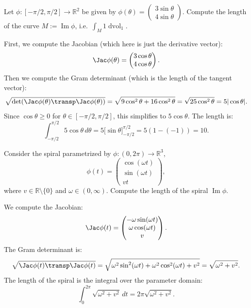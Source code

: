 \begin{example}
\label{ex:line_integral}
Let $\phi : [-\pi/2, \pi/2] \to \mathbb{R}^2$ be given by $\phi(\theta) = \begin{pmatrix} 3\sin\theta \\ 4\sin\theta \end{pmatrix}$.
Compute the length of the curve $M := \operatorname{Im}\phi$, i.e.\ $\int_M 1 \mathop{d\text{vol}}_1$.

First, we compute the Jacobian (which here is just the derivative vector):
\[\Jac\phi(\theta) = \begin{pmatrix} 3\cos\theta \\ 4\cos\theta \end{pmatrix}.\]
Then we compute the Gram determinant (which is the length of the tangent vector):
\[\sqrt{\det(\Jac\phi(\theta)\transp \Jac\phi(\theta))} = \sqrt{9\cos^2\theta + 16\cos^2\theta} = \sqrt{25\cos^2\theta} = 5|\cos\theta|.\]
Since $\cos\theta \geq 0$ for $\theta \in [-\pi/2, \pi/2]$, this simplifies to $5\cos\theta$.
The length is:
\[\int_{-\pi/2}^{\pi/2} 5\cos\theta \,d\theta = 5\big[\sin\theta\big]_{-\pi/2}^{\pi/2} = 5(1 - (-1)) = 10.\]
\end{example}

\begin{example}
\label{ex:spiral_length}
Consider the spiral parametrized by $\phi : (0,2\pi) \to \mathbb{R}^3$,
\[\phi(t) = \begin{pmatrix} \cos(\omega t) \\ \sin(\omega t) \\ vt \end{pmatrix},\]
where $v \in \mathbb{R}\setminus\{0\}$ and $\omega \in (0,\infty)$. Compute the length of the spiral $\operatorname{Im}\phi$.

We compute the Jacobian:
\[\Jac\phi(t) = \begin{pmatrix} -\omega\sin(\omega t) \\ \omega\cos(\omega t) \\ v \end{pmatrix}.\]
The Gram determinant is:
\[\sqrt{\Jac\phi(t)\transp \Jac\phi(t)} = \sqrt{\omega^2\sin^2(\omega t) + \omega^2\cos^2(\omega t) + v^2} = \sqrt{\omega^2 + v^2}.\]
The length of the spiral is the integral over the parameter domain:
\[\int_0^{2\pi} \sqrt{\omega^2 + v^2} \,dt = 2\pi\sqrt{\omega^2 + v^2}.\]
\end{example}

